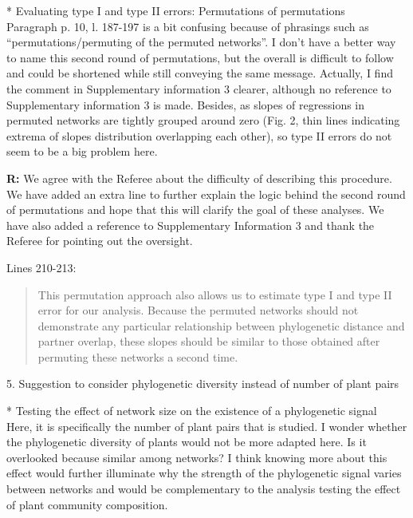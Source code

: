 \documentclass[12pt]{letter}
\newenvironment{refquote}{\bigskip \begin{it}}{\end{it}\smallskip}
\begin{document}
		\begin{refquote}
			* Evaluating type I and type II errors: Permutations of permutations\\
			Paragraph p. 10, l. 187-197 is a bit confusing because of phrasings such as “permutations/permuting of the permuted networks”. I don't have a better way to name this second round of permutations, but the overall is difficult to follow and could be shortened while still conveying the same message.
			Actually, I find the comment in Supplementary information 3 clearer, although no reference to Supplementary information 3 is made.
			Besides, as slopes of regressions in permuted networks are tightly grouped around zero (Fig. 2, thin lines indicating 
			extrema of slopes distribution overlapping each other), so type II errors do not seem to be a big problem here.
		\end{refquote}


		\textbf{R:} We agree with the Referee about the difficulty of describing this procedure. We have added an extra line to further explain the logic behind the second round of permutations and hope that this will clarify the goal of these analyses. We have also added a reference to Supplementary Information 3 and thank the Referee for pointing out the oversight.


		Lines 210-213:

		\begin{quotation}

			This permutation approach also allows us to estimate type I and type II 
			error for our analysis. Because the permuted networks should not demonstrate any particular relationship between phylogenetic distance and partner overlap, these slopes should be similar to those obtained after permuting these networks a second time.

		\end{quotation}


	5. Suggestion to consider phylogenetic diversity instead of number of plant pairs

		\begin{refquote}
			* Testing the effect of network size on the existence of a phylogenetic signal\\
			Here, it is specifically the number of plant pairs that is studied. I wonder whether the phylogenetic diversity of plants would not be more adapted here. Is it overlooked because similar among networks?
			I think knowing more about this effect would further illuminate why the strength of the phylogenetic signal varies between networks and would be complementary to the analysis testing the effect of plant community composition.
		\end{refquote}
\end{document}
